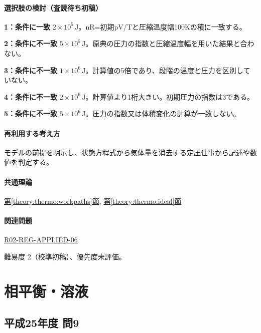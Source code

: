 \paragraph{選択肢の検討（査読待ち初稿）}\mbox{}\par

\noindent\textbf{1：条件に一致} \(2\times10^5\,\mathrm{J}\)。nR=初期pV/Tと圧縮温度幅100Kの積に一致する。\par

\noindent\textbf{2：条件に不一致} \(5\times10^5\,\mathrm{J}\)。原典の圧力の指数と圧縮温度幅を用いた結果と合わない。\par

\noindent\textbf{3：条件に不一致} \(1\times10^6\,\mathrm{J}\)。計算値の5倍であり、段階の温度と圧力を区別していない。\par

\noindent\textbf{4：条件に不一致} \(2\times10^6\,\mathrm{J}\)。計算値より1桁大きい。初期圧力の指数は3である。\par

\noindent\textbf{5：条件に不一致} \(5\times10^6\,\mathrm{J}\)。圧力の指数又は体積変化の計算が一致しない。\par

\paragraph{再利用する考え方} モデルの前提を明示し、状態方程式から気体量を消去する定圧仕事から記述や数値を判定する。

\paragraph{共通理論} \hyperref[theory:thermo:workpaths]{第\ref*{theory:thermo:workpaths}節}, \hyperref[theory:thermo:ideal]{第\ref*{theory:thermo:ideal}節}

\paragraph{関連問題} \hyperref[q:r02-reg-applied-06]{R02-REG-APPLIED-06}

\par 難易度 2（校準初稿）、優先度未評価。

\section{相平衡・溶液}

\subsection{平成25年度 問9}
\label{q:h25-reg-applied-09}

